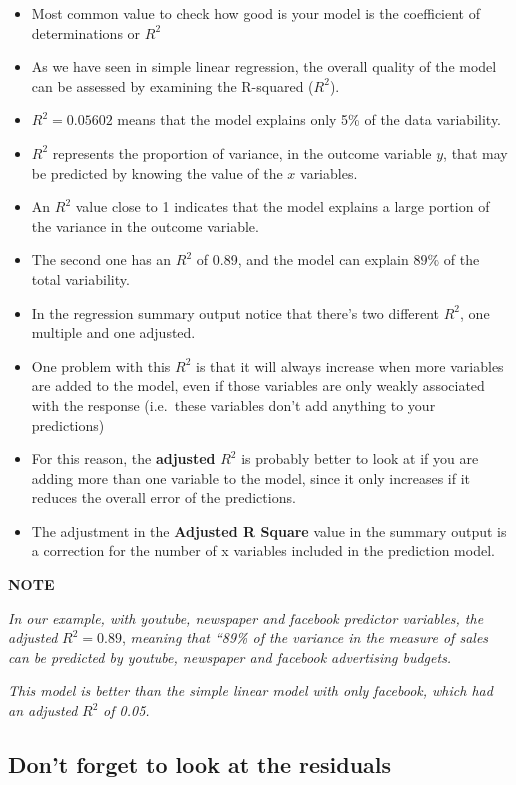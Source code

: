 \documentclass[
]{book}
\begin{document}
\begin{itemize}
\item
  Most common value to check how good is your model is the coefficient of determinations or \(R^2\)
\item
  As we have seen in simple linear regression, the overall quality of the model can be assessed by examining the R-squared (\(R^2\)).
\item
  \(R^2=0.05602\) means that the model explains only 5\% of the data variability.
\item
  \(R^2\) represents the proportion of variance, in the outcome variable \(y\), that may be predicted by knowing the value of the \(x\) variables.
\item
  An \(R^2\) value close to 1 indicates that the model explains a large portion of the variance in the outcome variable.
\item
  The second one has an \(R^2\) of 0.89, and the model can explain \(89\%\) of the total variability.
\item
  In the regression summary output notice that there's two different \(R^2\), one multiple and one adjusted.
\item
  One problem with this \(R^2\) is that it will always increase when more variables are added to the model, even if those variables are only weakly associated with the response (i.e.~these variables don't add anything to your predictions)
\item
  For this reason, the \textbf{adjusted} \(R^2\) is probably better to look at if you are adding more than one variable to the model, since it only increases if it reduces the overall error of the predictions.
\item
  The adjustment in the \textbf{Adjusted R Square} value in the summary output is a correction for the number of x variables included in the prediction model.
\end{itemize}

\textbf{NOTE}

\emph{In our example, with youtube, newspaper and facebook predictor variables, the adjusted} \(R^2 = 0.89\), \emph{meaning that ``89\% of the variance in the measure of sales can be predicted by youtube, newspaper and facebook advertising budgets.}

\emph{This model is better than the simple linear model with only facebook, which had an adjusted} \(R^2\) \emph{of 0.05.}

\hypertarget{dont-forget-to-look-at-the-residuals}{%
\subsection{Don't forget to look at the residuals}\label{dont-forget-to-look-at-the-residuals}}
\end{document}

